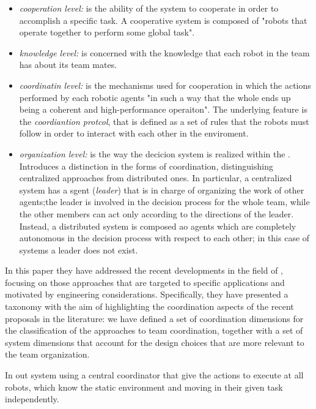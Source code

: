 \begin{itemize}
    \item \textit{cooperation level:} is the ability of the system to cooperate in order 
    to accomplish a specific task. A cooperative system is composed of "robots that operate together
    to perform some global task". 
    \item \textit{knowledge level:} is concerned with the knowledge that each robot in the team
    has about its team mates.
    \item \textit{coordinatin level:} is the mechanisms used for cooperation in which the actions performed by each 
    robotic agents "in such a way that the whole ends up being a coherent and high-performance operaiton".
    The underlying feature is the \textit{coordiantion protcol}, that is defined as a set
    of rules that the robots must follow in order to interact with each other in the enviroment. 
    \item \textit{organization level:} is the way the decicion system is realized within the \mrs. 
    Introduces a distinction in the forms of coordination, distinguishing centralized approaches
    from distributed ones. In particular, a centralized system has a sgent (\textit{leader}) that is in
    charge of organizing the work of other agents;the leader
    is involved in the decision process for the whole team, while
    the other members can act only according to the directions of
    the leader. 
    Instead, a distributed system is composed ao agents which are completely autonomous in the 
    decision process with respect to each other; in this case of systems a leader does not exist. 
\end{itemize}
In this paper they have addressed the recent developments in the field of \mrs, focusing 
on those approaches that are targeted to specific applications and motivated by engineering
considerations. Specifically, they have presented a taxonomy with the aim of highlighting 
the coordination aspects of the recent proposals in the literature: we have defined a set of coordination
dimensions for the classification of the approaches to team coordination, together with a set of system dimensions that account
for the design choices that are more relevant to the team organization.

In out system using a central coordinator that give the actions to execute at all robots, which know the static environment and moving in their given task independently.

